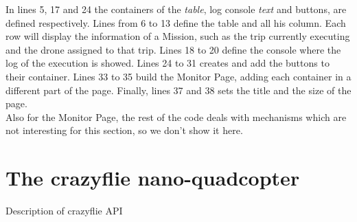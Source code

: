 In lines 5, 17 and 24 the containers of the \textit{table}, log console \textit{text} and buttons, are defined respectively.
Lines from 6 to 13 define the table and all his column. Each row will display the information of a Mission, such as the trip currently executing and the drone assigned to that trip.
Lines 18 to 20 define the console where the log of the execution is showed.
Lines 24 to 31 creates and add the buttons to their container.
Lines 33 to 35 build the Monitor Page, adding each container in a different part of the page.
Finally, lines 37 and 38 sets the title and the size of the page.
\\

Also for the Monitor Page, the rest of the code deals with mechanisms which are not interesting for this section, so we don't show it here.


\section{The crazyflie nano-quadcopter}\label{crazyflie}

Description of crazyflie API 

